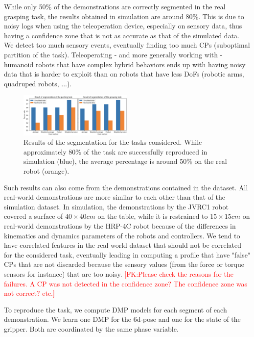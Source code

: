 \documentclass[conference]{IEEEtran}
\newcommand{\fk}[1]{\textcolor{red}{[FK:#1]}}
\begin{document}
While only 50\% of the demonstrations are correctly segmented in the real grasping task, the results obtained in simulation are around 80\%. This is due to noisy logs when using the teleoperation device, especially on sensory data, thus having a confidence zone that is not as accurate as that of the simulated data. We detect too much sensory events, eventually finding too much CPs (suboptimal partition of the task). Teleoperating - and more generally working with - humanoid robots that have complex hybrid behaviors ends up with having noisy data that is harder to exploit than on robots that have less DoFs (robotic arms, quadruped robots, ...).

\begin{figure}[t]
  \centering
  \includegraphics[width=0.5\textwidth]{img/results_segmentation.png}
  \caption{Results of the segmentation for the tasks considered. While approximately 80\% of the task are successfully reproduced in simulation (blue), the average percentage is around 50\% on the real robot (orange).}
  \label{fig:resultsSeg}
\end{figure}

Such results can also come from the demonstrations contained in the dataset. All real-world demonstrations are more similar to each other than that of the simulation dataset. In simulation, the demonstrations by the JVRC1 robot covered a surface of $40 \times 40 cm$ on the table, while it is restrained to $15 \times 15 cm$ on real-world demonstrations by the HRP-4C robot because of the differences in kinematics and dynamics parameters of the robots and controllers. We tend to have correlated features in the real world dataset that should not be correlated for the considered task, eventually leading in computing a profile that have "false" CPs that are not discarded because the sensory values (from the force or torque sensors for instance) that are too noisy. 
\fk{Please check the reasons for the failures. A CP was not detected in the confidence zone? The confidence zone was not correct? etc.}

To reproduce the task, we compute DMP models for each segment of each demonstration. We learn one DMP for the 6d-pose and one for the state of the gripper. Both are coordinated by the same phase variable.
\end{document}
